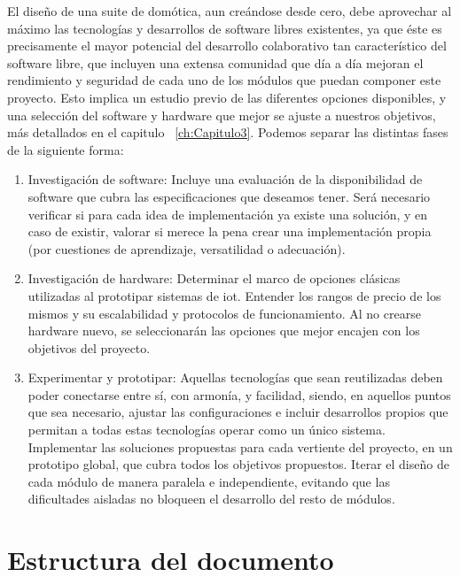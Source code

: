 El diseño de una suite de domótica, aun creándose desde cero, debe aprovechar al máximo las tecnologías y desarrollos de software libres existentes, ya que éste es precisamente el mayor potencial del desarrollo colaborativo tan característico del software libre, que incluyen una extensa comunidad que día a día mejoran el rendimiento y seguridad de cada uno de los módulos que puedan componer este proyecto. Esto implica un estudio previo de las diferentes opciones disponibles, y una selección del software y hardware que mejor se ajuste a nuestros objetivos, más detallados en el capitulo ~\ref{ch:Capitulo3}. Podemos separar las distintas fases de la siguiente forma:

\begin{enumerate}
  \item Investigación de software: Incluye una evaluación de la disponibilidad de software que cubra las especificaciones que deseamos tener. Será necesario verificar si para cada idea de implementación ya existe una solución, y en caso de existir, valorar si merece la pena crear una implementación propia (por cuestiones de aprendizaje, versatilidad o adecuación).

  \item Investigación de hardware: Determinar el marco de opciones clásicas utilizadas al prototipar sistemas de \gls{iot}. Entender los rangos de precio de los mismos y su escalabilidad y protocolos de funcionamiento. Al no crearse hardware nuevo, se seleccionarán las opciones que mejor encajen con los objetivos del proyecto.

  \item Experimentar y prototipar: Aquellas tecnologías que sean reutilizadas deben poder conectarse entre sí, con armonía, y facilidad, siendo, en aquellos puntos que sea necesario, ajustar las configuraciones e incluir desarrollos propios que permitan a todas estas tecnologías operar como un único sistema. Implementar las soluciones propuestas para cada vertiente del proyecto, en un prototipo global, que cubra todos los objetivos propuestos. Iterar el diseño de cada módulo de manera paralela e independiente, evitando que las dificultades aisladas no bloqueen el desarrollo del resto de módulos.

\end{enumerate}

\section{Estructura del documento}
\label{ch:Capitulo1.3}


